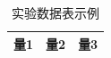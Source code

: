 
\begin{table}[H]
    \centering
    \caption{实验数据表示例}
    \begin{tabular}{ccc}
        \toprule
        量1 & 量2 & 量3 \\
        \midrule
        \bottomrule
    \end{tabular}
\end{table}
